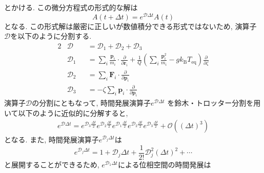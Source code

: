 とかける. この微分方程式の形式的な解は
\begin{equation}
 A(t + \Delta t)
  =
  e^{\mathcal{D} \Delta t} A(t)
  \label{eq:NoseHoover30}
\end{equation}
となる.
この形式解は厳密に正しいが数値積分できる形式ではないため, 演算子$\mathcal{D}$を以下のように分割する.
\begin{alignat}{2}
 &\mathcal{D}
 &&= \mathcal{D}_{1} + \mathcal{D}_{2} + \mathcal{D}_{3}
 \label{eq:NoseHoover31.1}
 \\
 &\mathcal{D}_{1}
 &&=
 \sum_{i} \frac{\bm{p}_{i}}{m_{i}} \cdot \frac{\partial}{\partial \bm{r}_{i}}
 +
 \frac{1}{Q}
 \left( \sum_{i} \frac{\bm{p}^{2}_{i}}{m_{i}} - g k_{\mathrm{B}} T_{\mathrm{eq}} \right)
 \frac{\partial}{\partial \zeta}
 \label{eq:NoseHoover31.2}
 \\
 &\mathcal{D}_{2}
 &&=
 \sum_{i} \bm{F}_{i} \cdot \frac{\partial}{\partial \bm{p}_{i}}
 \label{eq:NoseHoover31.3}
 \\
 &\mathcal{D}_{3}
 &&=
 - \zeta \sum_{i} \bm{p}_{i} \cdot \frac{\partial}{\partial \bm{p}_{i}}
 \label{eq:NoseHoover31.4}
\end{alignat}
演算子$\mathcal{D}$の分割にともなって, 時間発展演算子$e^{\mathcal{D} \Delta t}$
を鈴木・トロッター分割を用いて以下のように近似的に分解すると,
\begin{align}
 e^{\mathcal{D}\Delta t}
 =
 e^{\mathcal{D}_{3} \frac{\Delta t}{2}}
 e^{\mathcal{D}_{2} \frac{\Delta t}{2}}
 e^{\mathcal{D}_{1} \frac{\Delta t}{2}}
 e^{\mathcal{D}_{2} \frac{\Delta t}{2}}
 e^{\mathcal{D}_{3} \frac{\Delta t}{2}}
 +
 \mathcal{O}\left( (\Delta t)^{3} \right)
 \label{eq:NoseHoover32}
\end{align}
となる. また, 時間発展演算子$e^{\mathcal{D}_{j} \Delta t}$は
\begin{equation}
 e^{\mathcal{D}_{j} \Delta t}
 =
 1 + \mathcal{D}_{j} \Delta t
 + \frac{1}{2!} \mathcal{D}_{j}^{2} (\Delta t)^{2} + \cdots
 \label{eq:NoseHoover33}
\end{equation}
と展開することができるため, $e^{\mathcal{D}_{1} \Delta t}$による位相空間の時間発展は

